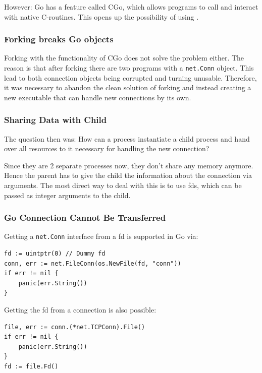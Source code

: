 \documentclass[10pt,a4paper,titlepage,twoside,english,final]{zhawreprt}
\begin{document}
However: \gls{Go} has a feature called \gls{CGo}, which allows programs to call and interact with native \gls{C}-routines.
This opens up the possibility of using \cite{fork}.

\subsubsection{Forking breaks Go objects}\label{sssec:ForkingBreaksGoObjects}
Forking with the functionality of \gls{CGo} does not solve the problem either.
The reason is that after forking there are two programs with a \texttt{net.Conn} object.
This lead to both connection objects being corrupted and turning unusable.
Therefore, it was necessary to abandon the clean solution of forking and instead creating a new executable that can handle new connections by its own.

\subsubsection{Sharing Data with Child}\label{sssec:SharingDataWithChild}
The question then was: How can a process instantiate a child process and hand over all resources to it necessary for handling the new connection?

Since they are 2 separate processes now, they don't share any memory anymore.
Hence the parent has to give the child the information about the connection via arguments.
The most direct way to deal with this is to use \glspl{fd}, which can be passed as integer arguments to the child.

\subsubsection{Go Connection Cannot Be Transferred}\label{sssec:GoConnectionCannotBeTransferred}
Getting a \texttt{net.Conn} interface from a \gls{fd} is supported in \gls{Go} via:
\setlistingGo
\begin{lstlisting}[caption={Getting a \texttt{net.Conn} interface from a \gls{fd}},label=lst:ConnFromFD]
fd := uintptr(0) // Dummy fd
conn, err := net.FileConn(os.NewFile(fd, "conn"))
if err != nil {
	panic(err.String())
}
\end{lstlisting}

Getting the \gls{fd} from a connection is also possible:
\setlistingGo
\begin{lstlisting}[caption={Getting the \gls{fd} from a \texttt{net.Conn} object},label=lst:FDFromConn]
file, err := conn.(*net.TCPConn).File()
if err != nil {
	panic(err.String())
}
fd := file.Fd()
\end{lstlisting}
\end{document}

